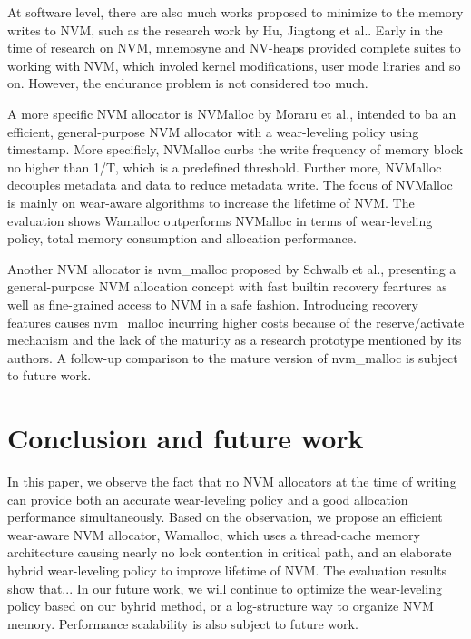 \documentclass[10pt, conference, compsocconf]{IEEEtran}
\begin{document}
At software level, there are also much works proposed to minimize to the memory writes to NVM, 
such as the research work by Hu, Jingtong et al.\cite{hu2013software}.
Early in the time of research on NVM, mnemosyne\cite{volos2011mnemosyne} and NV-heaps\cite{coburn2011nv} provided complete suites to working with NVM, which involed kernel modifications, user mode liraries and so on.
However, the endurance problem is not considered too much.

A more specific NVM allocator is NVMalloc by Moraru et al.\cite{moraru2013consistent},
intended to ba an efficient, general-purpose NVM allocator with a wear-leveling policy using timestamp.
More specificly, NVMalloc curbs the write frequency of memory block no higher than 1/T, which is a predefined threshold.
Further more, NVMalloc decouples metadata and data to reduce metadata write.
The focus of NVMalloc is mainly on wear-aware algorithms to increase the lifetime of NVM.
The evaluation shows Wamalloc outperforms NVMalloc in terms of wear-leveling policy, total memory consumption and allocation performance.

Another NVM allocator is nvm\_malloc proposed by Schwalb et al.\cite{schwalbnvm},
presenting a general-purpose NVM allocation concept with fast builtin recovery feartures
as well as fine-grained access to NVM in a safe fashion.
Introducing recovery features causes nvm\_malloc incurring higher costs
because of the reserve/activate mechanism and the lack of the maturity as a research prototype mentioned by its authors.
A follow-up comparison to the mature version of nvm\_malloc is subject to future work.

\section{Conclusion and future work}

In this paper, we observe the fact that
no NVM allocators at the time of writing can provide both an accurate wear-leveling policy and a good allocation performance simultaneously.
Based on the observation, we propose an efficient wear-aware NVM allocator, Wamalloc,
which uses a thread-cache memory architecture causing nearly no lock contention in critical path,
and an elaborate hybrid wear-leveling policy to improve lifetime of NVM.
The evaluation results show that...
In our future work, we will continue to optimize the wear-leveling policy based on our byhrid method,
or a log-structure way\cite{rumble2014log} to organize NVM memory.
Performance scalability is also subject to future work.
\end{document}
